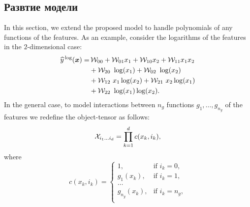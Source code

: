 
\subsection{Развтие модели \label{sec:exm-model-extension}}
In this section, we extend the proposed model to handle polynomials of any functions of the features.
As an example, consider the logarithms of the features in the $2$-dimensional case:
\begin{equation*}
  \begin{aligned}
    \widehat{y}^{\,\log}(\boldsymbol{x}) =& \,\mathcal{W}_{00} + \mathcal{W}_{01} x_1 +\mathcal{W}_{10} x_2 + \mathcal{W}_{11} x_1 x_2\\
    &+\mathcal{W}_{20} \,\, \log(x_1) + \mathcal{W}_{02} \,\, \log(x_2)\\
    &+ \mathcal{W}_{12} \,\, x_1 \log(x_2)+ \mathcal{W}_{21} \,\, x_2 \log(x_1)\\
    &+ \mathcal{W}_{22} \,\, \log(x_1) \log(x_2).
  \end{aligned}
\end{equation*}
In the general case, to model interactions between $n_g$ functions $g_1, \ldots, g_{n_g}$ of the features we redefine the object-tensor as follows:
\begin{equation*}
\mathcal{X}_{i_1 \ldots i_d} = \prod_{k=1}^d c(x_k, i_k),
\end{equation*}
where
\begin{equation*}
c(x_k, i_k) =
\begin{cases}
1, & \text{if } i_k = 0,\\
g_1(x_k), & \text{if } i_k = 1,\\
\ldots\\
g_{n_g}(x_k), & \text{if } i_k = n_g,\\
\end{cases}
\end{equation*}

